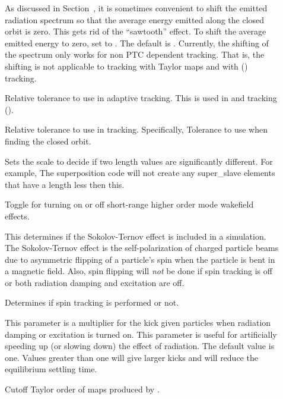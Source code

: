 {\begin{description}
%
\item[] \Newline
As discussed in Section~, it is sometimes convenient to shift the emitted radiation
spectrum so that the average energy emitted along the closed orbit is zero. This gets rid of the ``sawtooth''
effect. To shift the average emitted energy to zero, set  to . The
default is . Currently, the shifting of the spectrum only works for non PTC
dependent tracking. That is, the shifting is not applicable to tracking with Taylor maps and with
 () tracking.
%
\item[] \Newline
Relative tolerance to use in adaptive tracking. This is used in  and
 tracking ().
%
\item[] \Newline
Relative tolerance to use in tracking. Specifically, Tolerance to use when finding the closed orbit.
%
\item[] \Newline
Sets the scale to decide if two length values are significantly different. For example, The
superposition code will not create any super_slave elements that have a length less then this.
%
\item[] \Newline
Toggle for turning on or off short-range higher order mode wakefield effects.
%
\item[] \Newline
This determines if the Sokolov-Ternov effect is included in a simulation.  The Sokolov-Ternov
effect\cite{b:barber99} is the self-polarization of charged particle beams due to asymmetric flipping
of a particle's spin when the particle is bent in a magnetic field. Also, spin flipping will {\em
not} be done if spin tracking is off or both radiation damping and excitation are off.
%
\item[] \Newline
Determines if spin tracking is performed or not.
%
\item[] \Newline
This parameter is a multiplier for the kick given particles when radiation damping or excitation is
turned on.  This parameter is useful for artificially speeding up (or slowing down) the effect of
radiation.  The default value is one. Values greater than one will give larger kicks and will reduce
the equilibrium settling time.
%
\item[] \Newline
Cutoff Taylor order of maps produced by .
\end{description}

}
